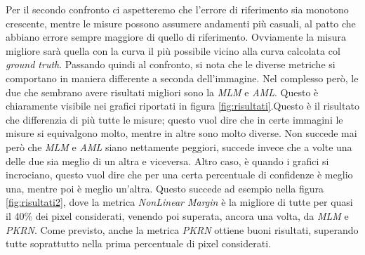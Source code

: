 \documentclass[12pt]{report}
\begin{document}
			\noindent Per il secondo confronto ci aspetteremo che l'errore di riferimento sia monotono crescente, mentre le misure possono assumere andamenti più casuali, al patto che abbiano errore sempre maggiore di quello di riferimento. Ovviamente la misura migliore sarà quella con la curva il più possibile vicino alla curva calcolata col \textit{ground truth}. Passando quindi al confronto, si nota che le diverse metriche si comportano in maniera differente a seconda dell'immagine. Nel complesso però, le due che sembrano avere risultati migliori sono la \textit{MLM} e \textit{AML}. Questo è chiaramente visibile nei grafici riportati in figura \ref{fig:risultati}.Questo è il risultato che differenzia di più tutte le misure; questo vuol dire che in certe immagini le misure si equivalgono molto, mentre in altre sono molto diverse. Non succede mai però che \textit{MLM} e \textit{AML} siano nettamente peggiori, succede invece che a volte una delle due sia meglio di un altra e viceversa. Altro caso, è quando i grafici si incrociano, questo vuol dire che per una certa percentuale di confidenze è meglio una, mentre poi è meglio un'altra. Questo succede ad esempio nella figura \ref{fig:risultati2}, dove la metrica \textit{NonLinear Margin} è la migliore di tutte per quasi il 40\% dei pixel considerati, venendo poi superata, ancora una volta, da \textit{MLM} e \textit{PKRN}. Come previsto, anche la metrica \textit{PKRN} ottiene buoni risultati, superando tutte soprattutto nella prima percentuale di pixel considerati. 		
			
\end{document}
